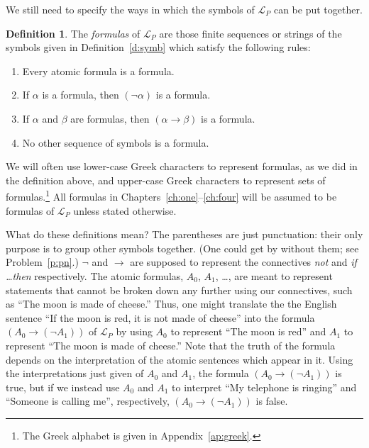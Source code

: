 \documentclass[12pt]{amsbook}
\theoremstyle{plain}
\theoremstyle{definition}
\newtheorem{defn}{Definition}[chapter]
\theoremstyle{remark}
\begin{document}
We still need to specify the ways in which the symbols of $\mathcal{L}_P$ can be put together.

\begin{defn} \label{d:form} 
The {\em formulas\/} of $\mathcal{L}_P$ are those finite sequences or strings of the symbols given in Definition~\ref{d:symb} which satisfy the following rules:
\begin{enumerate}
\item Every atomic formula is a formula.
\item If $\alpha$ is a formula,  then $(\lnot \alpha)$ is a formula.
\item If $\alpha$ and $\beta$ are formulas,  then $(\alpha \to \beta)$ is
a formula.
\item No other sequence of symbols is a formula.
\end{enumerate}
\end{defn}

We will often use lower-case Greek characters to represent formulas,  as we did in the definition above,  and upper-case Greek characters to represent sets of formulas.\footnote{The Greek alphabet is given in Appendix~\ref{ap:greek}.}  All formulas in Chapters~\ref{ch:one}--\ref{ch:four} will be assumed to be formulas of $\mathcal{L}_P$ unless stated otherwise.

What do these definitions mean?  The parentheses are just punctuation: their only purpose is to group other symbols together.  (One could get by without them;  see Problem~\ref{p:pn}.)  $\lnot$\index{$\lnot$} and $\to$\index{$\to$} are supposed to represent the connectives {\em not\/} and {\em if \dots then\/} respectively. The atomic formulas,  $A_0$,  $A_1$, \dots,  are meant to represent statements that cannot be broken down any further using our connectives,  such as ``The moon is made of cheese.''  Thus,  one might translate the the English sentence ``If the moon is red,  it is not made of cheese'' into the formula $(A_0 \to (\lnot A_1))$ of $\mathcal{L}_P$ by using $A_0$ to represent ``The moon is red'' and $A_1$ to represent ``The moon is made of cheese.''  Note that the truth of the formula depends on the interpretation of the atomic sentences which appear in it.  Using the interpretations just given of $A_0$ and $A_1$,  the formula $(A_0 \to (\lnot A_1))$ is true,  but if we instead use $A_0$ and $A_1$ to interpret ``My telephone is ringing'' and ``Someone is calling me'',  respectively,  $(A_0 \to (\lnot A_1))$ is false.
\end{document}
